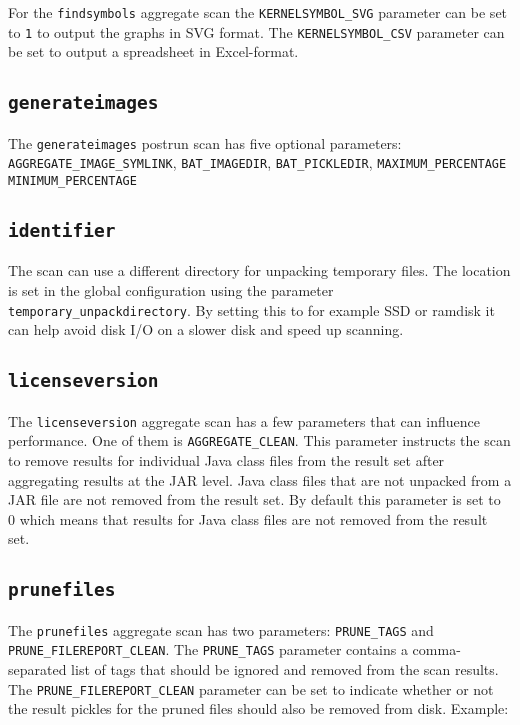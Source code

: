 \documentclass[10pt,a4paper]{article}
\begin{document}
For the \texttt{findsymbols} aggregate scan the \texttt{KERNELSYMBOL\_SVG}
parameter can be set to \texttt{1} to output the graphs in SVG format. The
\texttt{KERNELSYMBOL\_CSV} parameter can be set to output a spreadsheet in
Excel-format.

\subsection{\texttt{generateimages}}

The \texttt{generateimages} postrun scan has five optional parameters:
\texttt{AGGREGATE\_IMAGE\_SYMLINK}, \texttt{BAT\_IMAGEDIR}, \texttt{BAT\_PICKLEDIR}, \texttt{MAXIMUM\_PERCENTAGE}
\texttt{MINIMUM\_PERCENTAGE}

\subsection{\texttt{identifier}}

The scan can use a different directory for unpacking temporary files.
The location is set in the global configuration using the parameter
\texttt{temporary\_unpackdirectory}. By setting this to for example SSD or
ramdisk it can help avoid disk I/O on a slower disk and speed up scanning.

\subsection{\texttt{licenseversion}}

The \texttt{licenseversion} aggregate scan has a few parameters that can
influence performance. One of them is \texttt{AGGREGATE\_CLEAN}. This parameter
instructs the scan to remove results for individual Java class files from the
result set after aggregating results at the JAR level. Java class files that
are not unpacked from a JAR file are not removed from the result set. By
default this parameter is set to 0 which means that results for Java class
files are not removed from the result set.

\subsection{\texttt{prunefiles}}

The \texttt{prunefiles} aggregate scan has two parameters: \texttt{PRUNE\_TAGS}
and \texttt{PRUNE\_FILEREPORT\_CLEAN}. The \texttt{PRUNE\_TAGS} parameter
contains a comma-separated list of tags that should be ignored and removed from
the scan results. The \texttt{PRUNE\_FILEREPORT\_CLEAN} parameter can be set to
indicate whether or not the result pickles for the pruned files should also be
removed from disk. Example:
\end{document}
